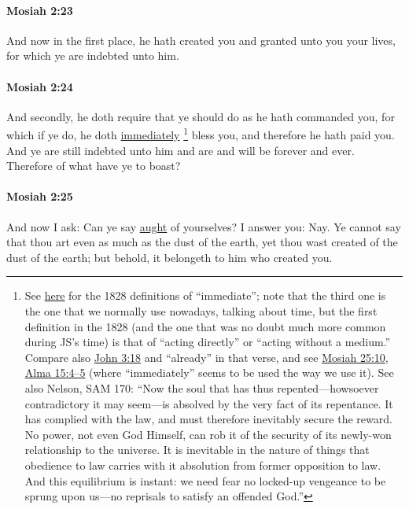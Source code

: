 		\paragraph{Mosiah 2:23} %
			\label{MOSIAH-2-23}
			
			And now in the first place, he hath created you
			and granted unto you your lives,
			for which ye are indebted unto him.
			
		\paragraph{Mosiah 2:24} %
			\label{MOSIAH-2-24}
			
			And secondly, he doth require
			that ye should do as he hath commanded you,
			for which if ye do,
			he doth \hyperref[IMMEDIATE]{immediately}%
				\footnote{%
					See \hyperref[IMMEDIATE]{here} for the 1828 definitions of ``immediate''; note that the third one is the one that we normally use nowadays, talking about time, but the first definition in the 1828 (and the one that was no doubt much more common during JS's time) is that of ``acting directly'' or ``acting without a medium.'' Compare also \hyperref[JOHN-3-18]{John 3:18} and ``already'' in that verse, and see \hyperref[MOSIAH-25-10]{Mosiah 25:10}, \hyperref[ALMA-15-4]{Alma 15:4--5} (where ``immediately'' seems to be used the way we use it). See also Nelson, SAM 170: ``Now the soul that has thus repented---howso­ever contradictory it may seem---is absolved by the very fact of its repentance. It has complied with the law, and must therefore inevitably secure the reward. No power, not even God Himself, can rob it of the security of its newly-won relationship to the universe. It is inevitable in the nature of things that obedience to law carries with it absolu­tion from former opposition to law. And this equilibrium is instant: we need fear no locked-up vengeance to be sprung upon us---no reprisals to satisfy an offended God.''
					}
			bless you,
			and therefore he hath paid you.
			And ye are still indebted unto him
			and are and will be forever and ever.
			Therefore of what have ye to boast?
			
		\paragraph{Mosiah 2:25} %
			\label{MOSIAH-2-25}
			
			And now I ask:
			Can ye say \hyperref[AUGHT-1828]{aught} of yourselves?
			I answer you: Nay.
			Ye cannot say that thou art even as much as the dust of the earth,
			yet thou wast created of the dust of the earth;
			but behold, it belongeth to him who created you.
			
